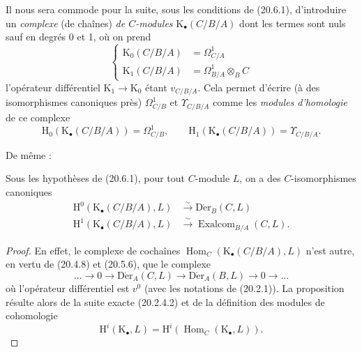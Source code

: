 \begin{env}[20.6.5]
\label{0.20.6.5-fr}
Il nous sera commode pour la suite, sous les conditions de (20.6.1),
d'introduire un \emph{complexe} (de chaînes) \emph{de $C$-modules}
$\mathrm{K}_\bullet(C/B/A)$ dont les termes sont nuls sauf en degrés 0
et 1, où on prend
\begin{equation}
\tag{20.6.5.1}
\label{0.20.6.5.1-fr}
\left\{
\begin{aligned}
  \mathrm{K}_0(C/B/A)&=\Omega^1_{C/A}\\
  \mathrm{K}_1(C/B/A)&=\Omega^1_{B/A}\otimes_B C
\end{aligned}
\right.
\end{equation}
l'opérateur différentiel $\mathrm{K}_1\to\mathrm{K}_0$ étant
$v_{C/B/A}$. Cela permet d'écrire (à des isomorphismes canoniques près)
$\Omega^1_{C/B}$ et $\Upsilon_{C/B/A}$ comme les \emph{modules
d'homologie} de ce complexe
\begin{equation}
\tag{20.6.5.2}
\label{0.20.6.5.2-fr}
  \mathrm{H}_0(\mathrm{K}_\bullet(C/B/A))=\Omega^1_{C/B},\qquad
  \mathrm{H}_1(\mathrm{K}_\bullet(C/B/A))=\Upsilon_{C/B/A}.
\end{equation}
\end{env}

De même :
\begin{proposition}[20.6.6]
\label{0.20.6.6-fr}
Sous les hypothèses de \textup{(20.6.1)}, pour tout $C$-module $L$, on a des
$C$-isomorphismes canoniques
\begin{align}
\tag{20.6.6.1}
\label{0.20.6.6.1-fr}
  \mathrm{H}^0(\mathrm{K}_\bullet(C/B/A),L)&\xrightarrow{\sim}\operatorname{D\acute{e}r}_B(C,L)\\
\tag{20.6.6.2}
\label{0.20.6.6.2-fr}
  \mathrm{H}^1(\mathrm{K}_\bullet(C/B/A),L)&\xrightarrow{\sim}
  \operatorname{Exalcom}_{B/A}(C,L).
\end{align}
\end{proposition}

\begin{proof}
En effet, le complexe de cochaînes
$\operatorname{Hom}_C(\mathrm{K}_\bullet(C/B/A),L)$ n'est autre, en vertu de (20.4.8)
et (20.5.6), que le complexe
\[
  \ldots\longrightarrow0\longrightarrow\operatorname{D\acute{e}r}_A(C,L)
  \longrightarrow\operatorname{D\acute{e}r}_A(B,L)\longrightarrow0\longrightarrow\ldots
\]
où l'opérateur différentiel est $v^0$ (avec les notations de (20.2.1)).
La proposition résulte alors de la suite exacte (20.2.4.2) et de la
définition des modules de cohomologie
\begin{equation}
\tag{20.6.6.3}
\label{0.20.6.6.3-fr}
  \mathrm{H}^i(\mathrm{K}_\bullet,L)=
  \mathrm{H}^i(\operatorname{Hom}_C(\mathrm{K}_\bullet,L)).
\end{equation}
\end{proof}

